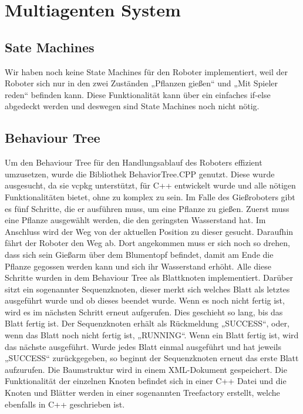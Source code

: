 \section{Multiagenten System}

\subsection{Sate Machines}

Wir haben noch keine State Machines für den Roboter implementiert, weil der Roboter sich nur in den zwei Zuständen „Pflanzen gießen“ und „Mit Spieler reden“ befinden kann. Diese Funktionalität kann über ein einfaches if-else abgedeckt werden und deswegen sind State Machines noch nicht nötig.

\subsection{Behaviour Tree}
Um den Behaviour Tree für den Handlungsablauf des Roboters effizient umzusetzen, wurde die Bibliothek BehaviorTree.CPP genutzt. Diese wurde ausgesucht, da sie vcpkg unterstützt, für C++ entwickelt wurde und alle nötigen Funktionalitäten bietet, ohne zu komplex zu sein. 
Im Falle des Gießroboters gibt es fünf Schritte, die er ausführen muss, um eine Pflanze zu gießen. Zuerst muss eine Pflanze ausgewählt werden, die den geringsten Wasserstand hat. Im Anschluss wird der Weg von der aktuellen Position zu dieser gesucht. Daraufhin fährt der Roboter den Weg ab. Dort angekommen muss er sich noch so drehen, dass sich sein Gießarm über dem Blumentopf befindet, damit am Ende die Pflanze gegossen werden kann und sich ihr Wasserstand erhöht. Alle diese Schritte wurden in dem Behaviour Tree als Blattknoten implementiert. Darüber sitzt ein sogenannter Sequenzknoten, dieser merkt sich welches Blatt als letztes ausgeführt wurde und ob dieses beendet wurde. Wenn es noch nicht fertig ist, wird es im nächsten Schritt erneut aufgerufen. Dies geschieht so lang, bis das Blatt fertig ist. Der Sequenzknoten erhält als Rückmeldung „SUCCESS“, oder, wenn das Blatt noch nicht fertig ist, „RUNNING“. Wenn ein Blatt fertig ist, wird das nächste ausgeführt. Wurde jedes Blatt einmal ausgeführt und hat jeweils „SUCCESS“ zurückgegeben, so beginnt der Sequenzknoten erneut das erste Blatt aufzurufen.
Die Baumstruktur wird in einem XML-Dokument gespeichert. Die Funktionalität der einzelnen Knoten befindet sich in einer C++ Datei und die Knoten und Blätter werden in einer sogenannten Treefactory erstellt, welche ebenfalls in C++ geschrieben ist.
